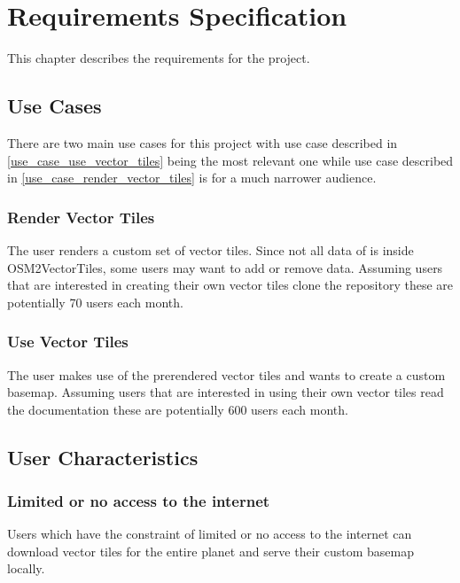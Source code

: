 \chapter{Requirements Specification}\label{requirements_specification}

This chapter describes the requirements for the project.

\section{Use Cases}\label{use_cases}

There are two main use cases for this project with use case described in \autoref{use_case_use_vector_tiles} being the most relevant one while use case described in \autoref{use_case_render_vector_tiles} is for a much narrower audience.

\subsection{Render Vector Tiles}\label{use_case_render_vector_tiles}

The user renders a custom set of vector tiles. Since not all data of \osm{} is inside OSM2VectorTiles, some users may want to add or remove data. Assuming users that are interested in creating their own vector tiles clone the \osmvt{} repository these are potentially 70 users each month.

\subsection{Use Vector Tiles}\label{use_case_use_vector_tiles}

The user makes use of the prerendered vector tiles and wants to create a custom basemap. Assuming users that are interested in using their own vector tiles read the documentation these are potentially 600 users each month.

\section{User Characteristics}\label{user_characteristics}

\subsection{Limited or no access to the internet}

Users which have the constraint of limited or no access to the internet can download vector tiles for the entire planet and serve their custom basemap locally.

